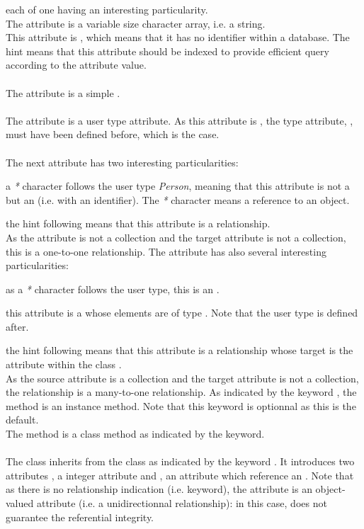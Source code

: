 each of one having an interesting particularity.
\\
The  attribute is a variable size character array, i.e. a string.
\\
This attribute is , which means that it has no identifier within
a database. The hint  means that this attribute should be
indexed to provide efficient query according to the attribute value.
\\
\\
The  attribute is a simple  .
\\
\\
The  attribute is a  user type attribute.
As this attribute is , the type attribute, ,
must have been defined before, which is the case.
\\
\\
The next attribute  has two interesting particularities:
\be
\item a \emph{*} character follows the user type \emph{Person}, meaning that this
attribute is not a  but an  (i.e. with
an identifier). The \emph{*} character
means a reference to an object.
\item the hint  following 
means that this attribute is a relationship.
\\
As the attribute  is not a collection and the target attribute
 is not a collection, this is a one-to-one relationship.
\ee
The  attribute has also several interesting particularities:
\be
\item as a \emph{*} character follows the user type, this is an .
\item this attribute is a  whose elements are 
of type .
Note that the user type  is defined after.
\item the hint  following 
means that this attribute is a relationship whose target is the
 attribute within the class .
\\
As the source attribute  is a collection and the target
attribute  is not a collection, the relationship is 
a many-to-one relationship.
\ee
As indicated by the keyword , the method        
 is an instance method. Note that this keyword
is optionnal as this is the default.
\\
The method  is a class method as indicated by
the  keyword.
\\
\\
The class  inherits from the class 
as indicated by the keyword .
It introduces two attributes , a  integer
attribute and , an  attribute which reference
an . Note that as there is no relationship
indication (i.e.  keyword), the  attribute is an
object-valued attribute (i.e. a unidirectionnal relationship):
in this case, \eyedb does not guarantee the referential integrity.
